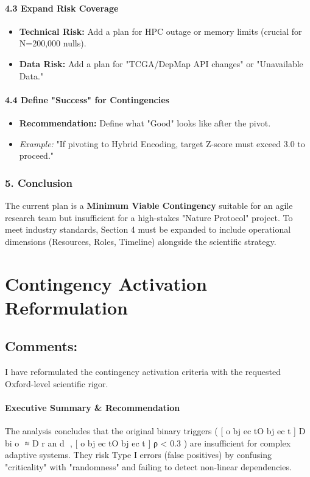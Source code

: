 \documentclass{article}
\begin{document}
\paragraph{4.3 Expand Risk Coverage}
\begin{itemize}
\item   \textbf{Technical Risk:} Add a plan for HPC outage or memory limits (crucial for N=200,000 nulls).
\item   \textbf{Data Risk:} Add a plan for "TCGA/DepMap API changes" or "Unavailable Data."
\end{itemize}

\paragraph{4.4 Define "Success" for Contingencies}
\begin{itemize}
\item   \textbf{Recommendation:} Define what "Good" looks like after the pivot.
\item   \textit{Example:} "If pivoting to Hybrid Encoding, target Z-score must exceed 3.0 to proceed."
\end{itemize}

\subsubsection{5. Conclusion}
The current plan is a \textbf{Minimum Viable Contingency} suitable for an agile research team but insufficient for a high-stakes "Nature Protocol" project. To meet industry standards, Section 4 must be expanded to include operational dimensions (Resources, Roles, Timeline) alongside the scientific strategy.


\section{Contingency Activation Reformulation}
\subsection{Comments:}

I have reformulated the contingency activation criteria with the requested Oxford-level scientific rigor.

\paragraph{Executive Summary \& Recommendation}
The analysis concludes that the original binary triggers ( [ o bj ec tO bj ec t ] D bi o ​ ≈ D r an d ​ , [ o bj ec tO bj ec t ] ρ < 0.3 ) are insufficient for complex adaptive systems. They risk Type I errors (false positives) by confusing "criticality" with "randomness" and failing to detect non-linear dependencies.
\end{document}
